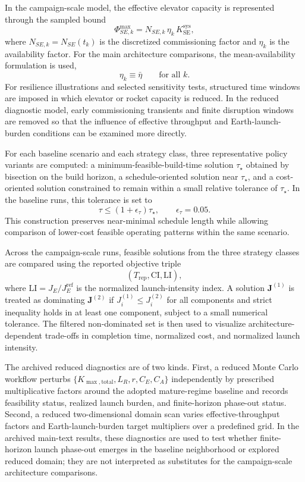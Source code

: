\documentclass[12pt]{article}
\begin{document}
In the campaign-scale model, the effective elevator capacity is represented through the sampled bound
\begin{equation}
	\Phi_{SE,k}^{\max}=N_{SE,k}\,\eta_k\,K_{\mathrm{SE}}^{\mathrm{sys}},
	\label{eq:phi_se_max_k_app}
\end{equation}
where $N_{SE,k}=N_{SE}(t_k)$ is the discretized commissioning factor and $\eta_k$ is the availability factor. For the main architecture comparisons, the mean-availability formulation is used,
\[
\eta_k\equiv\bar{\eta}\qquad \text{for all }k.
\]
For resilience illustrations and selected sensitivity tests, structured time windows are imposed in which elevator or rocket capacity is reduced. In the reduced diagnostic model, early commissioning transients and finite disruption windows are removed so that the influence of effective throughput and Earth-launch-burden conditions can be examined more directly.

For each baseline scenario and each strategy class, three representative policy variants are computed: a minimum-feasible-build-time solution $\tau_\star$ obtained by bisection on the build horizon, a schedule-oriented solution near $\tau_\star$, and a cost-oriented solution constrained to remain within a small relative tolerance of $\tau_\star$. In the baseline runs, this tolerance is set to
\[
\tau \le (1+\epsilon_\tau)\tau_\star,\qquad \epsilon_\tau=0.05.
\]
This construction preserves near-minimal schedule length while allowing comparison of lower-cost feasible operating patterns within the same scenario.

Across the campaign-scale runs, feasible solutions from the three strategy classes are compared using the reported objective triple
\[
(T_{\mathrm{rep}},\mathrm{CI},\mathrm{LI}),
\]
where $\mathrm{LI}=J_E/J_E^{\mathrm{ref}}$ is the normalized launch-intensity index. A solution $\mathbf{J}^{(1)}$ is treated as dominating $\mathbf{J}^{(2)}$ if $J_i^{(1)}\le J_i^{(2)}$ for all components and strict inequality holds in at least one component, subject to a small numerical tolerance. The filtered non-dominated set is then used to visualize architecture-dependent trade-offs in completion time, normalized cost, and normalized launch intensity.

The archived reduced diagnostics are of two kinds. First, a reduced Monte Carlo workflow perturbs \(\{K_{\max,\mathrm{total}},L_R,r,C_E,C_A\}\) independently by prescribed multiplicative factors around the adopted mature-regime baseline and records feasibility status, realized launch burden, and finite-horizon phase-out status. Second, a reduced two-dimensional domain scan varies effective-throughput factors and Earth-launch-burden target multipliers over a predefined grid. In the archived main-text results, these diagnostics are used to test whether finite-horizon launch phase-out emerges in the baseline neighborhood or explored reduced domain; they are not interpreted as substitutes for the campaign-scale architecture comparisons.
\end{document}
